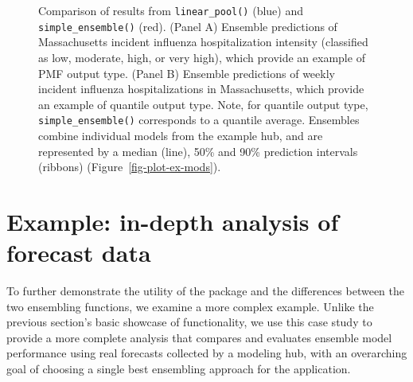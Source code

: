\documentclass[
  article,
  shortnames,
  notitle]{jss}
\begin{document}
\begin{figure}


\caption{\label{fig-plot-ex-quantile-and-linear-pool}Comparison of
results from \texttt{linear\_pool()} (blue) and
\texttt{simple\_ensemble()} (red). (Panel A) Ensemble predictions of
Massachusetts incident influenza hospitalization intensity (classified
as low, moderate, high, or very high), which provide an example of PMF
output type. (Panel B) Ensemble predictions of weekly incident influenza
hospitalizations in Massachusetts, which provide an example of quantile
output type. Note, for quantile output type, \texttt{simple\_ensemble()}
corresponds to a quantile average. Ensembles combine individual models
from the example hub, and are represented by a median (line), 50\% and
90\% prediction intervals (ribbons) (Figure~\ref{fig-plot-ex-mods}).}

\end{figure}%

\section{Example: in-depth analysis of forecast
data}\label{sec-case-study}

To further demonstrate the utility of the  package and
the differences between the two ensembling functions, we examine a more
complex example. Unlike the previous section's basic showcase of
functionality, we use this case study to provide a more complete
analysis that compares and evaluates ensemble model performance using
real forecasts collected by a modeling hub, with an overarching goal of
choosing a single best ensembling approach for the application.
\end{document}

